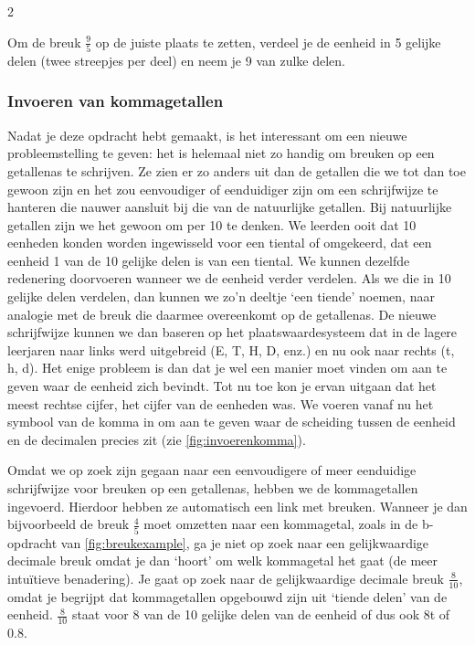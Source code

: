 \begin{multicols}{2}

Om de breuk \(\frac{9}{5}\) op de juiste plaats te zetten, verdeel je de eenheid in 5 gelijke delen (twee streepjes per deel) en neem je 9 van zulke delen.

\subsubsection*{Invoeren van kommagetallen}
Nadat je deze opdracht hebt gemaakt, is het interessant om een nieuwe probleemstelling te geven: het is helemaal niet zo handig om breuken op een getallenas te schrijven.
Ze zien er zo anders uit dan de getallen die we tot dan toe gewoon zijn en het zou eenvoudiger of eenduidiger zijn om een schrijfwijze te hanteren die nauwer aansluit bij die van de natuurlijke getallen.
Bij natuurlijke getallen zijn we het gewoon om per 10 te denken.
We leerden ooit dat 10 eenheden konden worden ingewisseld voor een tiental of omgekeerd, dat een eenheid 1 van de 10 gelijke delen is van een tiental.
We kunnen dezelfde redenering doorvoeren wanneer we de eenheid verder verdelen.
Als we die in 10 gelijke delen verdelen, dan kunnen we zo'n deeltje `een tiende' noemen, naar analogie met de breuk die daarmee overeenkomt op de getallenas.
De nieuwe schrijfwijze kunnen we dan baseren op het plaatswaardesysteem dat in de lagere leerjaren naar links werd uitgebreid (E, T, H, D, enz.) en nu ook naar rechts (t, h, d).
Het enige probleem is dan dat je wel een manier moet vinden om aan te geven waar de eenheid zich bevindt.
Tot nu toe kon je ervan uitgaan dat het meest rechtse cijfer, het cijfer van de eenheden was.
We voeren vanaf nu het symbool van de komma in om aan te geven waar de scheiding tussen de eenheid en de decimalen precies zit (zie \autoref{fig:invoerenkomma}).

Omdat we op zoek zijn gegaan naar een eenvoudigere of meer eenduidige schrijfwijze voor breuken op een getallenas, hebben we de kommagetallen ingevoerd.
Hierdoor hebben ze automatisch een link met breuken.
Wanneer je dan bijvoorbeeld de breuk \(\frac{4}{5}\) moet omzetten naar een kommagetal, zoals in de b-opdracht van \autoref{fig:breukexample}, ga je niet op zoek naar een gelijkwaardige decimale breuk omdat je dan `hoort' om welk kommagetal het gaat (de meer intuïtieve benadering).
Je gaat op zoek naar de gelijkwaardige decimale breuk \(\frac{8}{10}\), omdat je begrijpt dat kommagetallen opgebouwd zijn uit `tiende delen' van de eenheid.
\(\frac{8}{10}\) staat voor 8 van de 10 gelijke delen van de eenheid of dus ook 8t of \(\num{0.8}\).

\end{multicols}

